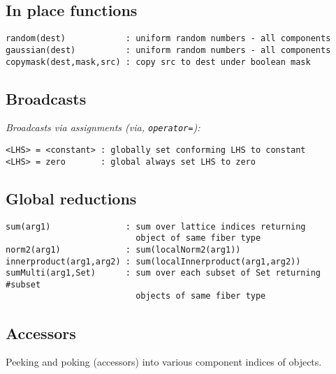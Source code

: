 \documentclass[12pt,letterpaper]{article}
\begin{document}
\subsection{In place functions}
\label{sec:inplace}

\begin{verbatim}
random(dest)            : uniform random numbers - all components
gaussian(dest)          : uniform random numbers - all components
copymask(dest,mask,src) : copy src to dest under boolean mask
\end{verbatim}


\medskip

\subsection{Broadcasts}
\label{sec:broadcasts}

{\em Broadcasts via assignments (via, {\tt operator=}):}
\begin{verbatim}
<LHS> = <constant> : globally set conforming LHS to constant
<LHS> = zero       : global always set LHS to zero
\end{verbatim}

\medskip

\subsection{Global reductions}
\label{sec:reductions}

\begin{verbatim}
sum(arg1)               : sum over lattice indices returning 
                          object of same fiber type
norm2(arg1)             : sum(localNorm2(arg1))
innerproduct(arg1,arg2) : sum(localInnerproduct(arg1,arg2))
sumMulti(arg1,Set)      : sum over each subset of Set returning #subset
                          objects of same fiber type
\end{verbatim}

\medskip

\subsection{Accessors}
\label{sec:peek}

Peeking and poking (accessors) into various component indices of objects.
\end{document}
